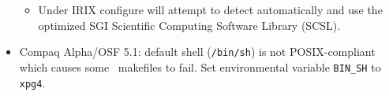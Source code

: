 \documentclass[12pt]{article}
\begin{document}
\begin{itemize}
\begin{itemize}
   \item Under IRIX configure will attempt to detect automatically and use
   the optimized SGI Scientific Computing Software Library (SCSL).
  \end{itemize}

\item Compaq Alpha/OSF 5.1: default shell ({\tt /bin/sh})
is not POSIX-compliant which causes some \PSIthree\ makefiles
to fail. Set environmental variable {\tt BIN\_SH} to {\tt xpg4}.

\end{itemize}
\end{document}
